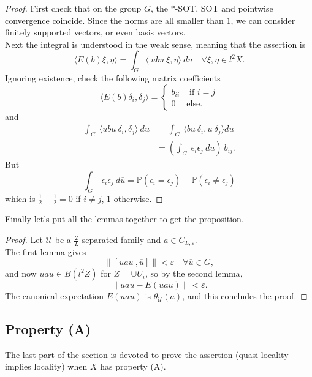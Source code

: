 \begin{proof}
First check that on the group $G$, the $*$-SOT, SOT and pointwise convergence coincide. Since the norms are all smaller than $1$, we can consider finitely supported vectors, or even basis vectors. \\

Next the integral is understood in the weak sense, meaning that the assertion is 
\[\langle E(b) \xi, \eta \rangle = \int_G \langle \ \overline u b \overline u \ \xi , \eta \rangle \ d\overline u \quad \forall \xi, \eta \in l^2 X.\]
 Ignoring existence, check the following matrix coefficients
\[ \langle E(b)\delta_i, \delta_j \rangle = \left\{\begin{array}{lr} b_{ii} & \text{ if }i =j \\ 0 & \text{else.}\end{array}\right. \]
and 
\[\begin{split}
\int_G \ \langle \overline u b \overline u  \ \delta_i , \delta_j   \rangle  \ d \overline u & = \int_G \ \langle b \overline u \ \delta_i , \overline u \ \delta_j \rangle d\overline u \\ 
				& = (\int_G \ \epsilon_i \epsilon_j \ d\overline u ) \ b_{ij} .
\end{split}\] 
But \[ \int_G \ \epsilon_i \epsilon_j \ d\overline u = \mathbb P (\epsilon_i = \epsilon_j ) - \mathbb P (\epsilon_i \neq \epsilon_j)\]
which is $\frac{1}{2} - \frac{1}{2}=0$ if $i\neq j$, $1$ otherwise.
\end{proof}

Finally let's put all the lemmas together to get the proposition.

\begin{proof} 
Let $\mathcal U $ be a $\frac{2}{L}$-separated family and $a\in C_{L,\varepsilon}$. \\
The first lemma gives 
\[ \| [ uau \ , \overline u ] \| < \varepsilon \quad \forall \overline u \in G,\]
and now $uau \in B(l^2 Z)$ for $Z = \cup U_i$, so by the second lemma,
\[ \| uau - E(uau) \| < \varepsilon.\]
The canonical expectation $E(uau)$ is $\theta_{\mathcal U}(a)$, and this concludes the proof.
\end{proof}


\subsection{Property (A)}

The last part of the section is devoted to prove the assertion (quasi-locality implies locality) when $X$ has property (A).

